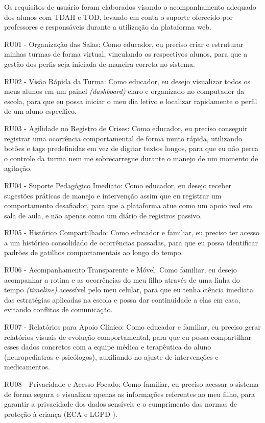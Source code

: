 Os requisitos de usuário foram elaborados visando o acompanhamento adequado dos alunos com TDAH e TOD, levando em conta o suporte oferecido por professores e responsáveis durante a utilização da plataforma web.

\vspace{0.3cm}
RU01 - Organização das Salas: Como educador, eu preciso criar e estruturar minhas turmas de forma virtual, vinculando os respectivos alunos, para que a gestão dos perfis seja iniciada de maneira correta no sistema. 

RU02 - Visão Rápida da Turma: Como educador, eu desejo visualizar todos os meus alunos em um painel \textit{(dashboard)} claro e organizado no computador da escola, para que eu possa iniciar o meu dia letivo e localizar rapidamente o perfil de um aluno específico.

RU03 - Agilidade no Registro de Crises: Como educador, eu preciso conseguir registrar uma ocorrência comportamental de forma muito rápida, utilizando botões e tags predefinidas em vez de digitar textos longos, para que eu não perca o controle da turma nem me sobrecarregue durante o manejo de um momento de agitação.

RU04 - Suporte Pedagógico Imediato: Como educador, eu desejo receber sugestões práticas de manejo e intervenção assim que eu registrar um comportamento desafiador, para que a plataforma atue como um apoio real em sala de aula, e não apenas como um diário de registros passivo.

RU05 - Histórico Compartilhado: Como educador e familiar, eu preciso ter acesso a um histórico consolidado de ocorrências passadas, para que eu possa identificar padrões de gatilhos comportamentais ao longo do tempo.

RU06 - Acompanhamento Transparente e Móvel: Como familiar, eu desejo acompanhar a rotina e as ocorrências do meu filho através de uma linha do tempo \textit{(timeline)} acessível pelo meu celular, para que eu tenha ciência imediata das estratégias aplicadas na escola e possa dar continuidade a elas em casa, evitando conflitos de comunicação.

RU07 - Relatórios para Apoio Clínico: Como educador e familiar, eu preciso gerar relatórios visuais de evolução comportamental, para que eu possa compartilhar esses dados concretos com a equipe médica e terapêutica do aluno (neuropediatras e psicólogos), auxiliando no ajuste de intervenções e medicamentos.

RU08 - Privacidade e Acesso Focado: Como familiar, eu preciso acessar o sistema de forma segura e visualizar apenas as informações referentes ao meu filho, para garantir a privacidade dos dados sensíveis e o cumprimento das normas de proteção à criança (ECA e LGPD \cite{lei13709_2018, lei8069_1990}).

